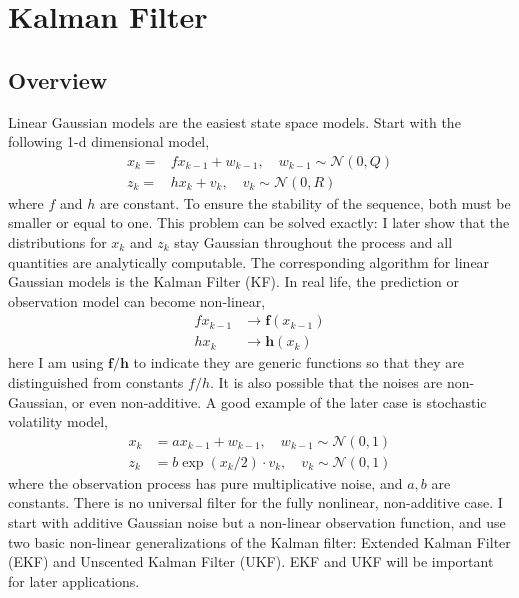 \documentclass{article}
\begin{document}
\newpage
\section{Kalman Filter}
\subsection{Overview}
Linear Gaussian models are the easiest state space models. Start with the following 1-d dimensional model, 
\begin{equation}
\begin{split}
x_k =& f x_{k-1} + w_{k-1}, \quad w_{k-1} \sim \mathcal{N}(0, Q) \\
z_k =& h x_k + v_k, \quad v_k \sim \mathcal{N}(0, R)
\end{split}
\end{equation}
where $f$ and $h$ are constant. To ensure the stability of the sequence, both must be smaller or equal to one. This problem can be solved exactly: I later show that the distributions for $x_k$ and $z_k$ stay Gaussian throughout the process and all quantities are analytically computable. The corresponding algorithm for linear Gaussian models is the Kalman Filter (KF). In real life, the prediction or observation model can become non-linear,
\begin{equation}
\begin{split}
f x_{k-1}  &\rightarrow \mathbf{f}(x_{k-1})  \\
h x_{k}  &\rightarrow \mathbf{h}(x_k)
\end{split}
\end{equation}
here I am using $\mathbf{f}/\mathbf{h}$ to indicate they are generic functions so that they are distinguished from constants $f/h$. It is also possible that  the noises are non-Gaussian, or even non-additive. A good example of the later case is stochastic volatility model, 
\begin{align}
x_{k} &= a x_{k-1} +  w_{k-1}, \quad w_{k-1} \sim \mathcal{N}(0, 1) \\
z_k &= b \exp(x_k/2) \cdot v_k, \quad v_k \sim \mathcal{N}(0, 1)
\end{align}
where the observation process has pure multiplicative noise, and $a,b$ are constants. There is no universal filter for the fully nonlinear, non-additive case. I start with additive Gaussian noise but a non-linear observation function, and use two basic non-linear generalizations of the Kalman filter: Extended Kalman Filter (EKF) and Unscented Kalman Filter (UKF). EKF and UKF will be important for later applications. 
\end{document}
